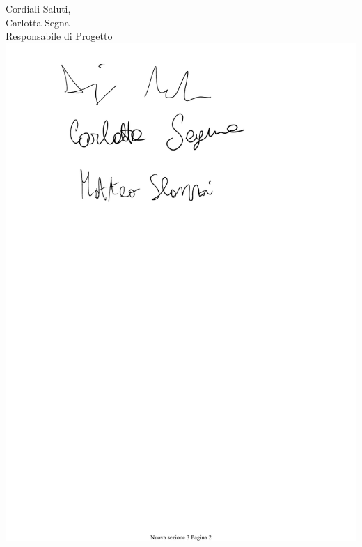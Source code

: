 \documentclass[11pt, a4paper]{letter} %
\begin{document}
\begin{letter}
\closing{Cordiali Saluti,\\
Carlotta Segna\\
Responsabile di Progetto
\includegraphics[scale=0.5]{images/CarlottaSegna.pdf}}




\end{letter}
\end{document}
